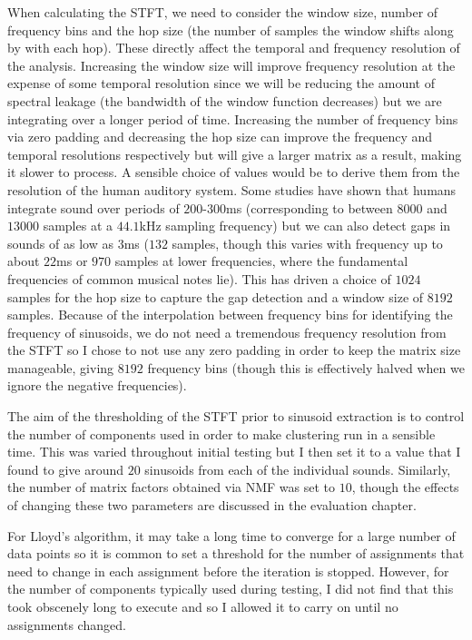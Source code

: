 \documentclass[10pt,twoside,a4paper]{report}
\begin{document}
When calculating the STFT, we need to consider the window size, number of frequency bins and the hop size (the number of samples the window shifts along by with each hop). These directly affect the temporal and frequency resolution of the analysis. Increasing the window size will improve frequency resolution at the expense of some temporal resolution since we will be reducing the amount of spectral leakage (the bandwidth of the window function decreases) but we are integrating over a longer period of time. Increasing the number of frequency bins via zero padding and decreasing the hop size can improve the frequency and temporal resolutions respectively but will give a larger matrix as a result, making it slower to process. A sensible choice of values would be to derive them from the resolution of the human auditory system. Some studies have shown that humans integrate sound over periods of $ 200 $-$ 300 $ms (corresponding to between $ 8000 $ and $ 13000 $ samples at a $ 44.1 $kHz sampling frequency) but we can also detect gaps in sounds of as low as $ 3 $ms ($ 132 $ samples, though this varies with frequency up to about $ 22 $ms or $ 970 $ samples at lower frequencies, where the fundamental frequencies of common musical notes lie). This has driven a choice of $ 1024 $ samples for the hop size to capture the gap detection and a window size of $ 8192 $ samples. Because of the interpolation between frequency bins for identifying the frequency of sinusoids, we do not need a tremendous frequency resolution from the STFT so I chose to not use any zero padding in order to keep the matrix size manageable, giving $ 8192 $ frequency bins (though this is effectively halved when we ignore the negative frequencies).

The aim of the thresholding of the STFT prior to sinusoid extraction is to control the number of components used in order to make clustering run in a sensible time. This was varied throughout initial testing but I then set it to a value that I found to give around $ 20 $ sinusoids from each of the individual sounds. Similarly, the number of matrix factors obtained via NMF was set to $ 10 $, though the effects of changing these two parameters are discussed in the evaluation chapter.

For Lloyd's algorithm, it may take a long time to converge for a large number of data points so it is common to set a threshold for the number of assignments that need to change in each assignment before the iteration is stopped. However, for the number of components typically used during testing, I did not find that this took obscenely long to execute and so I allowed it to carry on until no assignments changed.
\end{document}
